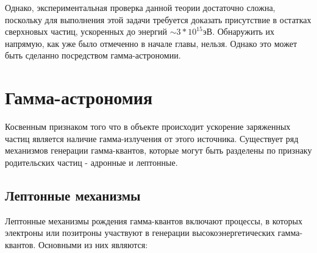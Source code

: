 Однако, экспериментальная проверка данной теории достаточно сложна, поскольку для выполнения этой задачи требуется доказать присутствие в остатках сверхновых частиц, ускоренных до энергий $\sim3*10^{15}$эВ. Обнаружить их напрямую, как уже было отмеченно в начале главы, нельзя. Однако это может быть сделанно посредством гамма-астрономии.


\section{Гамма-астрономия}\label{sec:ch1/sec2}
Косвенным признаком того что в объекте происходит ускорение заряженных частиц является наличие гамма-излучения от этого источника. Существует ряд механизмов генерации гамма-квантов, которые могут быть разделены по признаку родительских частиц - адронные и лептонные.
\subsection{Лептонные механизмы}\label{sec:ch1/sec2/sec1}
Лептонные механизмы рождения гамма-квантов включают процессы, в которых электроны или позитроны участвуют в генерации высокоэнергетических гамма-квантов. Основными из них являются:
